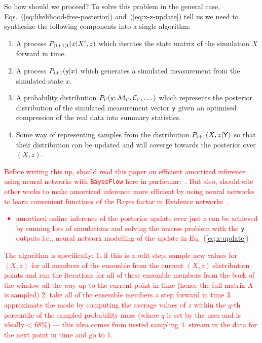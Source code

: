 So how should we proceed? To solve this problem in the general case, Eqs.~(\ref{eq:likelihood-free-posterior}) and~(\ref{eq:x-z-update}) tell us we need to synthesize the following components into a single algorithm:
\begin{enumerate}
\item{A process $P_{({\sf t}+1){\sf t}}(x\vert X', z)$ which iterates the state matrix of the simulation $X$ forward in time.}
\item{A process $P_{{\sf t}+1}({\sf y}\vert x)$ which generates a simulated measurement from the simulated state $x$.}
\item{A probability distribution $P_{{\sf t}'}({\sf y};{\cal M}_{{\sf t}'},{\cal C}_{{\sf t}'}, \dots )$ which represents the posterior distribution of the simulated measurement vector ${\sf y}$ given an optimised compression of the real data into summary statistics.}
\item{Some way of representing samples from the distribution $P_{{\sf t}+1}(X,z\vert {\sf Y})$ so that their distribution can be updated and will coverge towards the posterior over $(X,z)$.}
\end{enumerate}

\textcolor{red}{
Before writing this up, should read this paper on efficient amortized inference using neural networks with \texttt{BayesFlow} here in particular:~\cite{radev2020bayesflow}. But also, should cite other works to make amortized inference more efficient by using neural networks to learn convenient functions of the Bayes factor in Evidence networks~\cite{jeffrey2023evidence}.
\begin{itemize}
\item{amortized online inference of the posterior update over just $z$ can be 
achieved by running lots of simulations and solving the inverse problem with the ${\sf y}$ outputs
i.e., neural network modelling of the update in Eq.~(\ref{eq:z-update})} 
\end{itemize}
}


\textcolor{red}{The algorithm is specifically: 
1. if this is a refit step, sample new values for $(X,z)$ for all members of the ensemble from the current $(X,z)$ distribution points and run the iterations for all of these ensemble members from the back of the window all the way up to the current point in time (hence the full matrix $X$ is sampled)
2. take all of the ensemble members a step forward in time
3. approximate the mode by computing the average values of $z$ within the $q$-th percentile of the sampled probability mass (where $q$ is set by the user and is ideally < 68\%) --- this idea comes from nested sampling
4. stream in the data for the next point in time and go to 1.}


